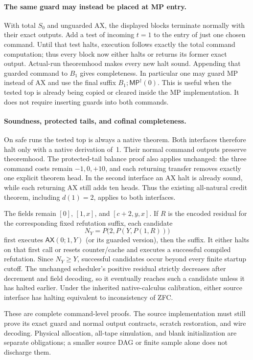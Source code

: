 \paragraph{The same guard may instead be placed at MP entry.}
With total $S_0$ and unguarded AX, the displayed blocks terminate normally
with their exact outputs.  Add a test of incoming $t=1$ to the entry of
just one chosen command.  Until that test halts, execution follows exactly
the total command computation; thus every block now either halts or
returns its former exact output.  Actual-run theoremhood makes every new
halt sound.  Appending that guarded command to $B_1$ gives completeness.
In particular one may guard MP instead of AX and use the final suffix
$B_1;\mathsf{MP}^{\dagger}(0)$.  This is useful when the tested top is
already being copied or cleared inside the MP implementation.  It does
not require inserting guards into both commands.

\paragraph{Soundness, protected tails, and cofinal completeness.}
On safe runs the tested top is always a native theorem.  Both interfaces
therefore halt only with a native derivation of~1.  Their normal command
outputs preserve theoremhood.  The protected-tail balance proof also
applies unchanged: the three command costs remain $-1,0,+10$, and each
returning transfer removes exactly one explicit theorem head.  In the
second interface an AX halt is already sound, while each returning AX
still adds ten heads.  Thus the existing all-natural credit theorem,
including $d(1)=2$, applies to both interfaces.

The fields remain $[0]$, $[1,x]$, and $[c+2,y,x]$.
If $R$ is the encoded residual for the corresponding fixed refutation
suffix, each candidate
\[
 N_Y=P\bigl(2,P(Y,P(1,R))\bigr)
\]
first executes $\mathsf{AX}(0;1,Y)$ (or its guarded version), then the
suffix.  It either halts on that first call or resets counter/cache and
executes a successful compiled refutation.  Since $N_Y\ge Y$, successful
candidates occur beyond every finite startup cutoff.  The unchanged
scheduler's positive residual strictly decreases after decrement and field
decoding, so it eventually reaches such a candidate unless it has halted
earlier.  Under the inherited native-calculus calibration, either source
interface has halting equivalent to inconsistency of ZFC.

These are complete command-level proofs.  The source implementation must
still prove its exact guard and normal output contracts, scratch
restoration, and wire decoding.  Physical allocation, all-tape simulation,
and blank initialization are separate obligations; a smaller source DAG
or finite sample alone does not discharge them.

